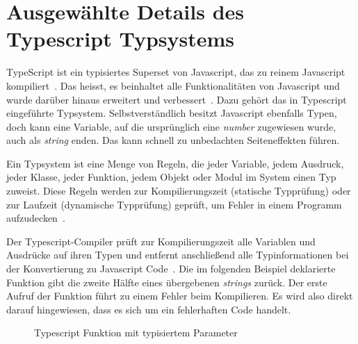

\section{Ausgewählte Details des Typescript Typsystems}
\label{sec:basics:typescript}
TypeScript ist ein typisiertes Superset von Javascript, das zu reinem Javascript kompiliert~\cite{typescript}.
Das heisst, es beinhaltet alle Funktionalitäten von Javascript und wurde darüber hinaus erweitert und verbessert~\cite{superset}.
Dazu gehört das in Typescript eingeführte Typsystem. Selbstverständlich besitzt Javascript ebenfalls Typen, doch kann eine Variable,
auf die ursprünglich eine \emph{number} zugewiesen wurde, auch als \emph{string} enden. Das kann schnell zu unbedachten Seiteneffekten führen.

Ein Typsystem ist eine Menge von Regeln, die jeder Variable, jedem Ausdruck, jeder Klasse,
jeder Funktion, jedem Objekt oder Modul im System einen Typ zuweist.
Diese Regeln werden zur  Kompilierungszeit (statische Typprüfung) oder zur Laufzeit (dynamische Typprüfung) geprüft,
um Fehler in einem Programm aufzudecken~\cite{typescript-typesystem-medium}.

Der Typescript-Compiler prüft zur Kompilierungszeit alle Variablen und Ausdrücke auf ihren Typen und entfernt anschließend alle Typinformationen
bei der Konvertierung zu Javascript Code~\cite{typescript-github-specification}.
Die im folgenden Beispiel deklarierte Funktion gibt die zweite Hälfte eines übergebenen \emph{strings} zurück.
Der erste Aufruf der Funktion führt zu einem Fehler beim Kompilieren. Es wird also direkt darauf hingewiesen, dass es sich um ein fehlerhaften Code handelt.

\begin{figure}[h]
    
    \caption{Typescript Funktion mit typisiertem Parameter}
    \label{fig:basics:typescript:1}
\end{figure}

